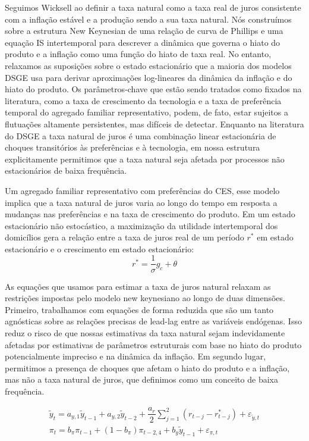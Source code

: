 Seguimos Wicksell ao definir a taxa natural como a taxa real de juros consistente com a inflação estável e a produção sendo a sua taxa natural. Nós construímos sobre a estrutura New Keynesian de uma relação de curva de Phillips e uma equação IS intertemporal para descrever a dinâmica que governa o hiato do produto e a inflação como uma função do hiato de taxa real. No entanto, relaxamos as suposições sobre o estado estacionário que a maioria dos modelos DSGE usa para derivar aproximações log-lineares da dinâmica da inflação e do hiato do produto. Os parâmetros-chave que estão sendo tratados como fixados na literatura, como a taxa de crescimento da tecnologia e a taxa de preferência temporal do agregado familiar representativo, podem, de fato, estar sujeitos a flutuações altamente persistentes, mas difíceis de detectar. Enquanto na literatura do DSGE a taxa natural de juros é uma combinação linear estacionária de choques transitórios às preferências e à tecnologia, em nossa estrutura explicitamente permitimos que a taxa natural seja afetada por processos não estacionários de baixa frequência.

Um agregado familiar representativo com preferências do CES, esse modelo implica que a taxa natural de juros varia ao longo do tempo em resposta a mudanças nas preferências e na taxa de crescimento do produto. Em um estado estacionário não estocástico, a maximização da utilidade intertemporal dos domicílios gera a relação entre a taxa de juros real de um período $r^{*}$ em estado estacionário e o crescimento em estado estacionário:
\begin{equation}
    r^{*} = \dfrac{1}{\sigma} g_c + \theta
\end{equation}

As equações que usamos para estimar a taxa de juros natural relaxam as restrições impostas pelo modelo new keynesiano ao longo de duas dimensões. Primeiro, trabalhamos com equações de forma reduzida que são um tanto agnósticas sobre as relações precisas de lead-lag entre as variáveis endógenas. Isso reduz o risco de que nossas estimativas da taxa natural sejam indevidamente afetadas por estimativas de parâmetros estruturais com base no hiato do produto potencialmente impreciso e na dinâmica da inflação. Em segundo lugar, permitimos a presença de choques que afetam o hiato do produto e a inflação, mas não a taxa natural de juros, que definimos como um conceito de baixa frequência.

\begin{eqnarray}
    \tilde{y}_t = a_{y,1}\tilde{y}_{t-1} + a_{y,2}\tilde{y}_{t-2} + \dfrac{a_r}{2} \sum_{j=1}^{2} (r_{t-j} - r_{t-j}^{*}) + \varepsilon_{\tilde{y},t} \\
    \pi_t = b_{\pi} \pi_{t-1} + (1 - b_{\pi}) \pi_{t-2,4} + b_y \tilde{y}_{t-1} + \varepsilon_{\pi,t}
\end{eqnarray}

